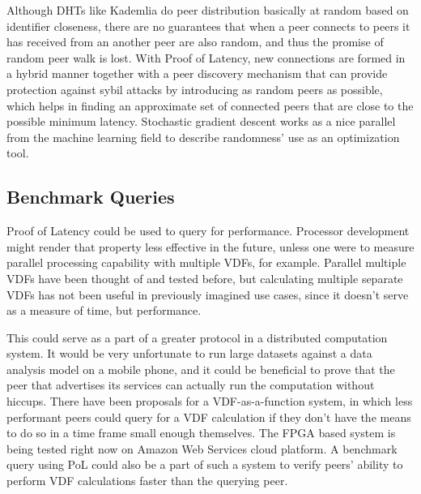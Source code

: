 Although DHTs like Kademlia do peer distribution basically at random based on identifier closeness, there are no guarantees that when a peer connects to peers it has received from an another peer are also random, and thus the promise of random peer walk is lost. With Proof of Latency, new connections are formed in a hybrid manner together with a peer discovery mechanism that can provide protection against sybil attacks by introducing as random peers as possible, which helps in finding an approximate set of connected peers that are close to the possible minimum latency. Stochastic gradient descent works as a nice parallel from the machine learning field to describe randomness' use as an optimization tool.

\subsection{Benchmark Queries}
Proof of Latency could be used to query for performance. Processor development might render that property less effective in the future, unless one were to measure parallel processing capability with multiple VDFs, for example. Parallel multiple VDFs have been thought of and tested before, but calculating multiple separate VDFs has not been useful in previously imagined use cases, since it doesn't serve as a measure of time, but performance.

This could serve as a part of a greater protocol in a distributed computation system. It would be very unfortunate to run large datasets against a data analysis model on a mobile phone, and it could be beneficial to prove that the peer that advertises its services can actually run the computation without hiccups.
There have been proposals for a VDF-as-a-function system, in which less performant peers could query for a VDF calculation if they don't have the means to do so in a time frame small enough themselves. The FPGA based system is being tested right now on Amazon Web Services cloud platform. A benchmark query using PoL could also be a part of such a system to verify peers' ability to perform VDF calculations faster than the querying peer.

